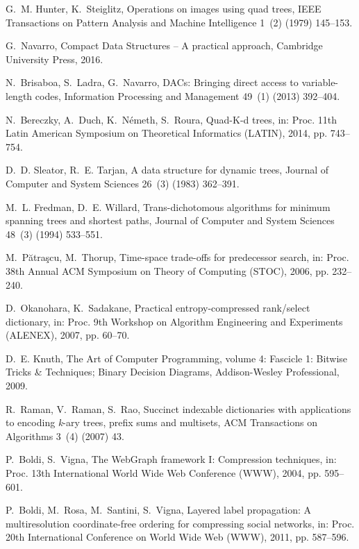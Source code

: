 \documentclass{elsarticle}
\begin{document}
\begin{thebibliography}{10}
G.~M. Hunter, K.~Steiglitz, Operations on images using quad trees, IEEE
  Transactions on Pattern Analysis and Machine Intelligence 1~(2) (1979)
  145--153.

G.~Navarro, Compact Data Structures -- A practical approach, Cambridge
  University Press, 2016.

N.~Brisaboa, S.~Ladra, G.~Navarro, {DACs}: Bringing direct access to
  variable-length codes, Information Processing and Management 49~(1) (2013)
  392--404.

N.~Bereczky, A.~Duch, K.~N{\'{e}}meth, S.~Roura, Quad-{K}-d trees, in: Proc.
  11th Latin American Symposium on Theoretical Informatics (LATIN), 2014, pp.
  743--754.

D.~D. Sleator, R.~E. Tarjan, A data structure for dynamic trees, Journal of
  Computer and System Sciences 26~(3) (1983) 362--391.

M.~L. Fredman, D.~E. Willard, Trans-dichotomous algorithms for minimum spanning
  trees and shortest paths, {Journal of Computer and System Sciences} 48~(3)
  (1994) 533--551.

M.~P{\u{a}}tra\c{s}cu, M.~Thorup, Time-space trade-offs for predecessor search,
  in: Proc. 38th Annual ACM Symposium on Theory of Computing (STOC), 2006, pp.
  232--240.

D.~Okanohara, K.~Sadakane, Practical entropy-compressed rank/select dictionary,
  in: Proc. 9th Workshop on Algorithm Engineering and Experiments (ALENEX),
  2007, pp. 60--70.

D.~E. Knuth, The Art of Computer Programming, volume 4: Fascicle 1: Bitwise
  Tricks \& Techniques; Binary Decision Diagrams, Addison-Wesley Professional,
  2009.

R.~Raman, V.~Raman, S.~Rao, Succinct indexable dictionaries with applications
  to encoding \emph{k}-ary trees, prefix sums and multisets, {ACM} Transactions
  on Algorithms 3~(4) (2007) 43.

P.~Boldi, S.~Vigna, The {W}eb{G}raph framework {I}: {C}ompression techniques,
  in: Proc. 13th International World Wide Web Conference (WWW), 2004, pp.
  595--601.

P.~Boldi, M.~Rosa, M.~Santini, S.~Vigna, Layered label propagation: A
  multiresolution coordinate-free ordering for compressing social networks, in:
  Proc. 20th International Conference on World Wide Web (WWW), 2011, pp.
  587--596.


\end{thebibliography}
\end{document}
